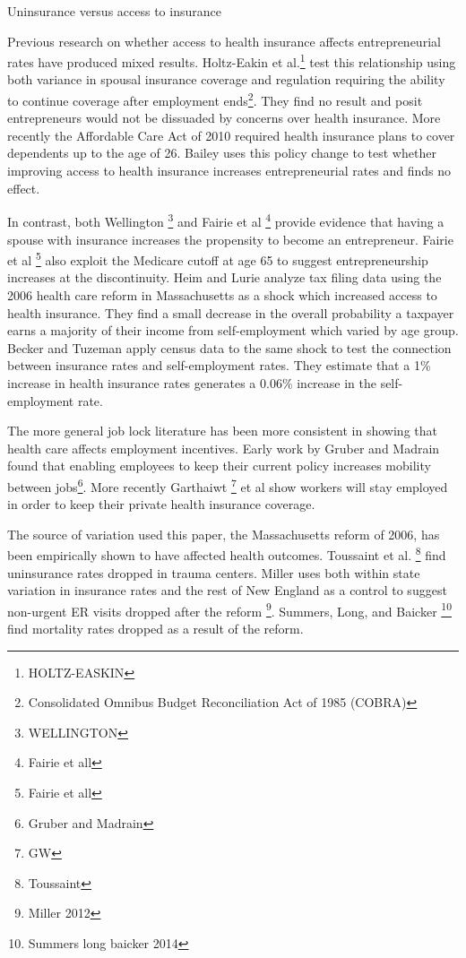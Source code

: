 \documentclass[12pt]{article}
\begin{document}
Uninsurance versus access to insurance

Previous research on whether access to health insurance affects entrepreneurial rates have produced mixed results. Holtz-Eakin et al.\footnote{HOLTZ-EASKIN} test this relationship using both variance in spousal insurance coverage and regulation requiring the ability to continue coverage after employment ends\footnote{Consolidated Omnibus Budget Reconciliation Act of 1985 (COBRA)}. They find no result and posit entrepreneurs would not be dissuaded by concerns over health insurance. More recently the Affordable Care Act of 2010 required health insurance plans to cover dependents up to the age of 26. Bailey uses this policy change to test whether improving access to health insurance increases entrepreneurial rates and finds no effect. 

In contrast, both Wellington \footnote{WELLINGTON} and Fairie et al \footnote{Fairie et all} provide evidence that having a spouse with insurance increases the propensity to become an entrepreneur. Fairie et al \footnote{Fairie et all} also exploit the Medicare cutoff at age 65 to suggest entrepreneurship increases at the discontinuity. Heim and Lurie analyze tax filing data using the 2006 health care reform in Massachusetts as a shock which increased access to health insurance. They find a small decrease in the overall probability a taxpayer earns a majority of their income from self-employment which varied by age group. Becker and Tuzeman apply census data to the same shock to test the connection between insurance rates and self-employment rates. They estimate that a 1\% increase in health insurance rates generates a 0.06\% increase in the self-employment rate. 

The more general job lock literature has been more consistent in showing that health
care affects employment incentives. Early work by Gruber and Madrain found that enabling
employees to keep their current policy increases mobility between jobs\footnote{Gruber and Madrain}. More recently Garthaiwt \footnote{GW} et al show workers will stay employed in order to keep their private health insurance coverage. 
\begin{comment}
Dhaval et al. show increased Medicare enrollment led to lower employment rates for pregnant women. 
\end{comment}

The source of variation used this paper, the Massachusetts reform of 2006, has been empirically shown to have affected health outcomes. Toussaint et al. \footnote{Toussaint} find uninsurance rates dropped in trauma centers. Miller uses both within state variation in insurance rates and the rest of New England as a control to suggest non-urgent ER visits dropped after the reform \footnote{Miller 2012}.  Summers, Long, and Baicker \footnote{Summers long baicker 2014} find mortality rates dropped as a result of the reform. 
\end{document}
